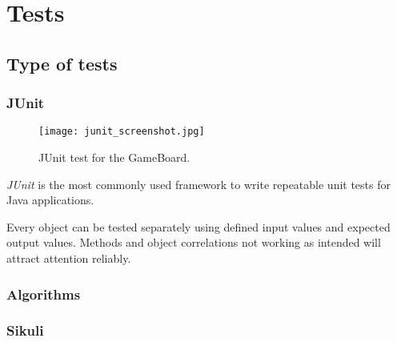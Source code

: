 \section{Tests}

\subsection{Type of tests}

\subsubsection{JUnit}

\begin{figure}[h]
	\centering
	\texttt{[image: junit\_screenshot.jpg]}
	\caption{JUnit test for the GameBoard.}
	\label{img:screenJUnit}
\end{figure}
\emph{JUnit} is the most commonly used framework to write repeatable unit tests for Java applications.\par
Every object can be tested separately using defined input values and expected output values. Methods and object correlations not working as intended will attract attention reliably.\par

\subsubsection{Algorithms}


\subsubsection{Sikuli}

